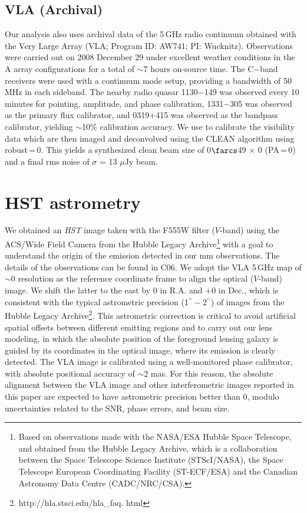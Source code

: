 \documentclass[]{emulateapj}
\begin{document}
\subsection{VLA (Archival)} %
Our analysis also uses archival data of the 5\,GHz
radio continuum obtained with the
Very Large Array (VLA; Program ID: AW741; PI: Wucknitz).
Observations were carried out on 2008 December 29 under excellent weather
conditions in the A array configurations for a total of $\sim$7 hours on-source time. The C$-$band receivers were used with a continuum mode setup,
providing a bandwidth of 50 MHz in each sideband.
The nearby radio quasar 1130$-$149 was observed every 10 minutes for
pointing, amplitude, and phase calibration, 1331$-$305 was observed as the
primary flux calibrator, and 0319$+$415 was observed as the bandpass
calibrator, yielding $\sim$10\% calibration accuracy.
We use  to calibrate the visibility data which
are then imaged and deconvolved using
the CLEAN algorithm using robust\,=\,0. This yields a synthesized clean
beam size of 0$\farcs$49 $\times$ 0 (PA\,=\,0) and a final
rms noise of $\sigma$ = 13 $\mu$Jy beam\pmOne.


\section{HST astrometry} \label{sec:HST}
We obtained an {\it HST} image taken with the F555W filter ($V$-band)
using the ACS/Wide Field Camera from the
Hubble Legacy Archive\footnote{Based on observations
made with the NASA/ESA Hubble Space Telescope, and obtained from the Hubble
Legacy Archive, which is a collaboration between the Space Telescope Science
Institute (STScI/NASA), the Space Telescope European Coordinating Facility
(ST-ECF/ESA) and the Canadian Astronomy Data Centre (CADC/NRC/CSA).}
with a goal to understand the origin of the emission detected
in our mm observations. The details of the observations can be found
in C06. We adopt the VLA 5\,GHz map of
$\sim$0 resolution as the
reference coordinate frame to align the optical ($V$-band) image.
We shift the latter to the east by 0 in R.A. and $+$0 in
Dec., which is consistent with the typical astrometric precision (1$^{\prime\prime}-$2$^{\prime\prime}$) of
images from the Hubble Legacy Archive\footnote{http://hla.stsci.edu/hla\_faq.
html}. This astrometric correction is critical to avoid artificial spatial
offsets between different emitting regions and to carry out our lens modeling,
in which the absolute position of the foreground lensing galaxy is guided by its
coordinates in the optical image, where its emission is clearly detected.
The VLA image is calibrated using a well-monitored phase
calibrator, with absolute positional accuracy of $\sim$2 mas.
For this reason, the absolute alignment between the VLA image and other
interferometric images reported in this paper are expected to have astrometric
precision better than 0, modulo uncertainties related to the SNR, phase
errors, and beam size.
\end{document}
